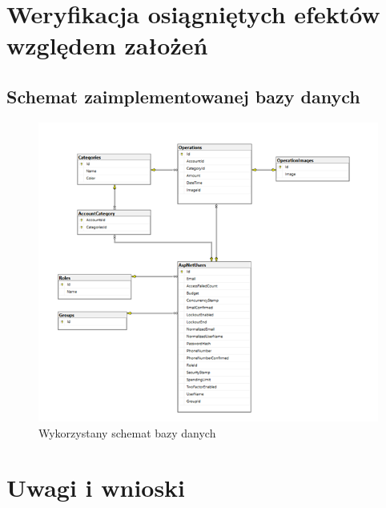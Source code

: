 \documentclass[12pt,a4paper,oneside]{article}
\begin{document}
\section{Weryfikacja osiągniętych efektów względem założeń}
\subsection{Schemat zaimplementowanej bazy danych}
\begin{figure}[H]
    \centering
    \includegraphics[width=\hsize,keepaspectratio]{DB2.png}
    \caption{Wykorzystany schemat bazy danych}
\end{figure}

\section{Uwagi i wnioski}
\end{document}
